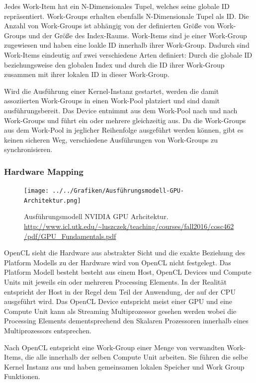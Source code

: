 Jedes Work-Item hat ein N-Dimensionales Tupel, welches seine globale ID repräsentiert.
Work-Groups erhalten ebenfalls N-Dimensionale Tupel als ID.
Die Anzahl von Work-Groups ist abhängig von der definierten Größe von Work-Groups und der Größe des Index-Raums.
Work-Items sind je einer Work-Group zugewiesen und haben eine loakle ID innerhalb ihrer Work-Group.
Dadurch sind Work-Items eindeutig auf zwei verschiedene Arten definiert: Durch die globale ID beziehungsweise den globalen Index und durch die ID ihrer Work-Group zusammen mit ihrer lokalen ID in dieser Work-Group.

Wird die Ausführung einer Kernel-Instanz gestartet, werden die damit assoziierten Work-Groups in einen Work-Pool platziert und sind damit ausführungsbereit.
Das Device entnimmt aus dem Work-Pool nach und nach Work-Groups und führt ein oder mehrere gleichzeitig aus.
Da die Work-Groups aus dem Work-Pool in jeglicher Reihenfolge ausgeführt werden können, gibt es keinen sicheren Weg, verschiedene Ausführungen von Work-Groups zu synchronisieren.

\subsubsection*{Hardware Mapping}
\begin{figure}
	\centering
	\texttt{[image: ../../Grafiken/Ausführungsmodell-GPU-Architektur.png]}
	\caption{Ausführungsmodell NVIDIA GPU Arhcitektur. \url{http://www.icl.utk.edu/~luszczek/teaching/courses/fall2016/cosc462/pdf/GPU_Fundamentals.pdf}}
	\label{fig::ga04}
\end{figure} 

OpenCL sieht die Hardware aus abstrakter Sicht und die exakte Beziehung des Platform Modells zu der Hardware wird von OpenCL nicht festgelegt.
Das Platform Modell besteht besteht aus einem Host, OpenCL Devices und Compute Units mit jeweils ein oder mehreren Processing Elements.
In der Realität entspricht der Host in der Regel dem Teil der Anwendung, der auf der CPU ausgeführt wird.
Das OpenCL Device entspricht meist einer GPU und eine Compute Unit kann als Streaming Multiprozessor gesehen werden wobei die Processing Elements dementsprechend den Skalaren Prozessoren innerhalb eines Multiprozessors entsprechen.



Nach OpenCL entspricht eine Work-Group einer Menge von verwandten Work-Items, die alle innerhalb der selben Compute Unit arbeiten.
Sie führen die selbe Kernel Instanz aus und haben gemeinsamen lokalen Speicher und Work Group Funktionen.

